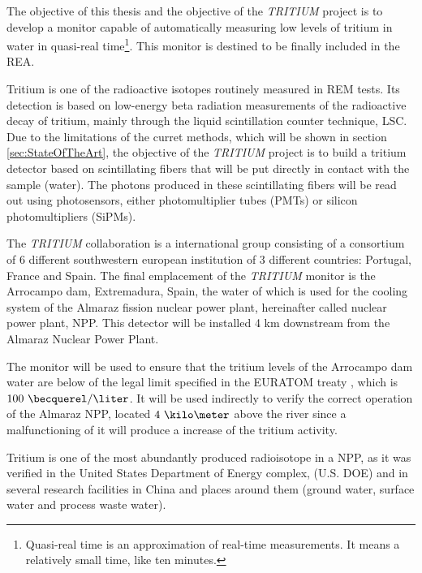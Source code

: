 The objective of this thesis and the objective of the \textit{TRITIUM} project is to develop a monitor capable of automatically measuring low levels of tritium in water in quasi-real time\footnote{Quasi-real time is an approximation of real-time measurements. It means a relatively small time, like ten minutes.}. This monitor is destined to be finally included in the REA.

Tritium is one of the radioactive isotopes routinely measured in REM tests. Its detection is based on low-energy beta radiation measurements of the radioactive decay of tritium, mainly through the liquid scintillation counter technique, LSC. Due to the limitations of the curret methods, which will be shown in section \ref{sec:StateOfTheArt}, the objective of the \textit{TRITIUM} project is to build a tritium detector based on scintillating fibers that will be put directly in contact with the sample (water). The photons produced in these scintillating fibers will be read out using photosensors, either photomultiplier tubes (PMTs) or silicon photomultipliers (SiPMs). 

The \textit{TRITIUM} collaboration is a international group consisting of a consortium of 6 different southwestern european institution of 3 different countries: Portugal, France and Spain. The final emplacement of the \textit{TRITIUM} monitor is the Arrocampo dam, Extremadura, Spain, the water of which is used for the cooling system of the Almaraz fission nuclear power plant, hereinafter called nuclear power plant, NPP. This detector will be installed 4 km downstream from the Almaraz Nuclear Power Plant.

The monitor will be used to ensure that the tritium levels of the Arrocampo dam  water are below of the legal limit specified in the EURATOM treaty \cite{100BqL}, which is $100~\becquerel/\liter$. It will be used indirectly to verify the correct operation of the Almaraz NPP, located $4~\kilo\meter$ above the river since a malfunctioning of it will produce a increase of the tritium activity.

Tritium is one of the most abundantly produced radioisotope in a NPP, as it was verified in the United States Department of Energy complex, (U.S. DOE) \cite{FiberDetector1a, FiberDetector1b} and in several research facilities in China \cite{CommonEmissionTritium} and places around them (ground water, surface water and process waste water).

